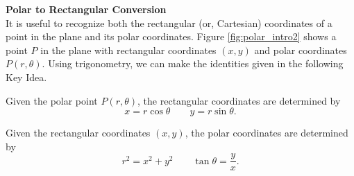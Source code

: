 \noindent\textbf{\large Polar to Rectangular Conversion}\\

It is useful to recognize both the rectangular (or, Cartesian) coordinates of a point in the plane and its polar coordinates. Figure \ref{fig:polar_intro2} shows a point $P$ in the plane with rectangular coordinates $(x,y)$ and polar coordinates $P(r,\theta)$. Using trigonometry, we can make the identities given in the following Key Idea.

{Given the polar point $P(r,\theta)$, the rectangular coordinates are determined by $$x=r\cos \theta\qquad y=r\sin \theta.$$

Given the rectangular coordinates $(x,y)$, the polar coordinates are determined by
$$ r^2=x^2+y^2\qquad \tan \theta = \frac yx.$$
}

